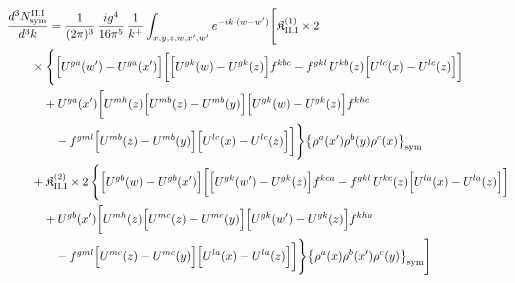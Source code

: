 \begingroup\small
\begin{align}\label{eq:H-II.I-3}
&\frac{d^{3}N^{\rm II.I}_{{\rm sym}}}{d^{3}k}=\frac{1}{(2\pi)^{3}}\, \frac{ig^{4}}{16\pi^{5}}\, \frac{1}{k^{+}} \int_{x,y,z,w,x',w'}e^{-ik\cdot(w-w')}\Bigg[ \mathfrak{K}^{(1)}_{\rm II.I} \times 2\notag\\
&\quad\quad \times \Bigg\{\Big[U^{ga}(w')-U^{ga}(x')\Big]\bigg[\Big[U^{gk}(w)-U^{gk}(z)\Big]f^{kbc} -f^{gkl}\, U^{kb}(z)\Big[U^{lc}(x)-U^{lc}(z)\Big]\bigg]\notag\\
&\quad\quad\quad +U^{ga}(x')\bigg[U^{mh}(z)\Big[U^{mb}(z)-U^{mb}(y)\Big]\Big[U^{gk}(w)-U^{gk}(z)\Big]f^{khc}\notag\\
&\quad\quad\quad\quad -f^{gml}\Big[U^{mb}(z)-U^{mb}(y)\Big]\Big[U^{lc}(x)-U^{lc}(z)\Big]\bigg]\Bigg\}\big\{\rho^{a}(x')\rho^{b}(y)\rho^{c}(x)\big\}_{\rm sym}\notag\\
&\quad\quad + \mathfrak{K}^{(2)}_{\rm II.I} \times 2\, \Bigg\{\Big[U^{gb}(w)-U^{gb}(x')\Big]\bigg[\Big[U^{gk}(w')-U^{gk}(z)\Big]f^{kca} -f^{gkl}\, U^{kc}(z)\Big[U^{la}(x)-U^{la}(z)\Big]\bigg]\notag\\
&\quad\quad\quad +U^{gb}(x')\bigg[U^{mh}(z)\Big[U^{mc}(z)-U^{mc}(y)\Big]\Big[U^{gk}(w')-U^{gk}(z)\Big]f^{kha}\notag\\
&\quad\quad\quad\quad -f^{gml}\Big[U^{mc}(z)-U^{mc}(y)\Big]\Big[U^{la}(x)-U^{la}(z)\Big]\bigg]\Bigg\}\big\{\rho^{a}(x)\rho^{b}(x')\rho^{c}(y)\big\}_{\rm sym}\Bigg]
\end{align}
\endgroup
